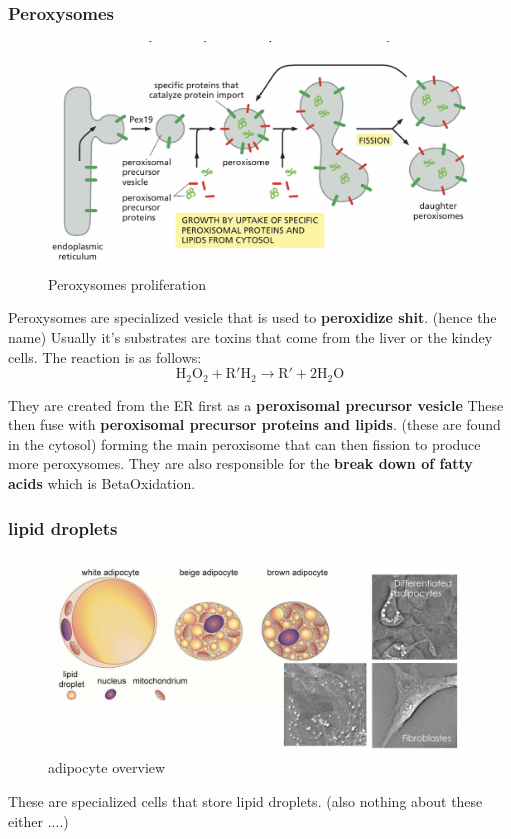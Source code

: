 \documentclass[../main.tex]{subfiles}
\begin{document}
\subsubsection{Peroxysomes}
\begin{figure}[H]
    \centering
    \includegraphics[width=0.5\linewidth]{Peroxy.png}
    \caption{Peroxysomes proliferation}
    \label{fig:enter-label}
\end{figure}
Peroxysomes are specialized vesicle that is used to \textbf{peroxidize shit}. (hence the name) Usually it's substrates are toxins that come from the liver or the kindey cells. The reaction is as follows:
\begin{equation}
\mathrm{H_2O_2} + \mathrm{R'H_2} \rightarrow \mathrm{R'} + 2\mathrm{H_2O}
\end{equation}

They are created from the ER first as a \textbf{peroxisomal precursor vesicle} These then fuse with \textbf{peroxisomal precursor proteins and lipids}. (these are found in the cytosol) forming the main peroxisome that can then fission to produce more peroxysomes. They are also responsible for the \textbf{break down of fatty acids} which is \gls{BetaOxidation}. 


\subsubsection{lipid droplets}
\begin{figure}[H]
    \centering
    \includegraphics[width=0.5\linewidth]{fatCells.png}
    \caption{adipocyte overview}
    \label{fig:enter-label}
\end{figure}

These are specialized cells that store lipid droplets. (also nothing about these either ....)
\end{document}
